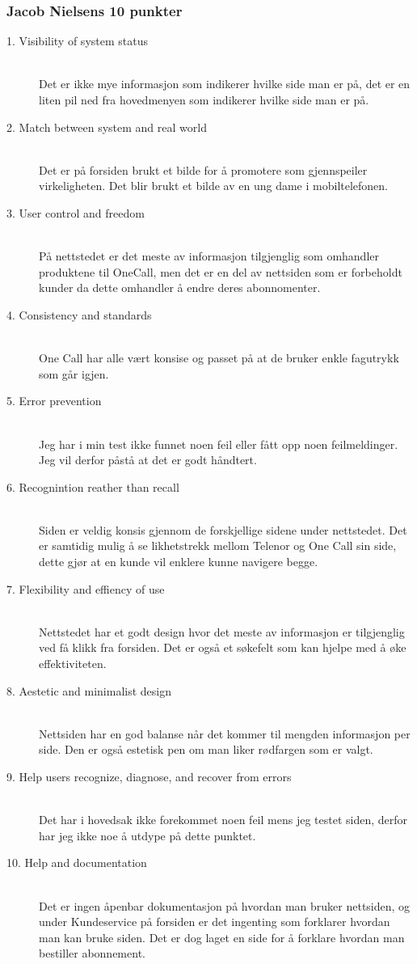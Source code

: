 \documentclass[a4paper, 10pt]{article}
\begin{document}
\subsubsection*{Jacob Nielsens 10 punkter}

\begin{description}
  \item[1. Visibility of system status] \hfill \\
    Det er ikke mye informasjon som indikerer hvilke side man er på, det er en liten pil ned fra hovedmenyen som indikerer hvilke side man er på.
  \item[2. Match between system and real world] \hfill \\
    Det er på forsiden brukt et bilde for å promotere som gjennspeiler virkeligheten. Det blir brukt et bilde av en ung dame i mobiltelefonen.
  \item[3. User control and freedom] \hfill \\
    På nettstedet er det meste av informasjon tilgjenglig som omhandler produktene til OneCall, men det er en del av nettsiden som er forbeholdt kunder da dette omhandler å endre deres abonnomenter.
  \item[4. Consistency and standards] \hfill \\
    One Call har alle vært konsise og passet på at de bruker enkle fagutrykk som går igjen.
  \item[5. Error prevention] \hfill \\
    Jeg har i min test ikke funnet noen feil eller fått opp noen feilmeldinger. Jeg vil derfor påstå at det er godt håndtert.
  \item[6. Recognintion reather than recall] \hfill \\
    Siden er veldig konsis gjennom de forskjellige sidene under nettstedet. Det er samtidig mulig å se likhetstrekk mellom Telenor og One Call sin side, dette gjør at en kunde vil enklere kunne navigere begge.
  \item[7. Flexibility and effiency of use] \hfill \\
    Nettstedet har et godt design hvor det meste av informasjon er tilgjenglig ved få klikk fra forsiden. Det er også et søkefelt som kan hjelpe med å øke effektiviteten.
  \item[8. Aestetic and minimalist design] \hfill \\
    Nettsiden har en god balanse når det kommer til mengden informasjon per side. Den er også estetisk pen om man liker rødfargen som er valgt.
  \item[9. Help users recognize, diagnose, and recover from errors] \hfill \\
    Det har i hovedsak ikke forekommet noen feil mens jeg testet siden, derfor har jeg ikke noe å utdype på dette punktet.
  \item[10. Help and documentation] \hfill \\
    Det er ingen åpenbar dokumentasjon på hvordan man bruker nettsiden, og under Kundeservice på forsiden er det ingenting som forklarer hvordan man kan bruke siden. Det er dog laget en side for å forklare hvordan man bestiller abonnement.
\end{description}
\end{document}
